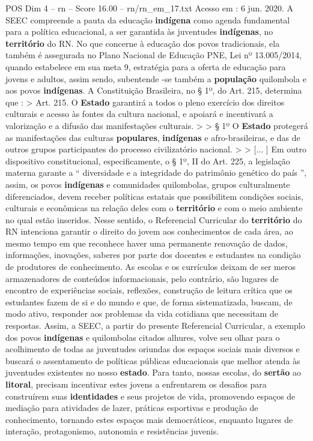 \begin{textsample}{POS Dim 4 – rn – Score 16.00 – rn/rn\_em\_17.txt}
Acesso em : 6 jun. 2020.
A SEEC compreende a pauta da educação \textbf{indígena} como agenda fundamental para a política educacional, a ser garantida às juventudes \textbf{indígenas}, no \textbf{território} do RN.
No que concerne à educação dos povos tradicionais, ela também é assegurada no Plano Nacional de Educação PNE, Lei nº 13.005/2014, quando estabelece em sua meta 9, estratégia para a oferta de educação para jovens e adultos, assim sendo, subentende -se também a \textbf{população} quilombola e aos povos \textbf{indígenas}.
A Constituição Brasileira, no § 1º, do Art. 215, determina que : > Art. 215.
O \textbf{Estado} garantirá a todos o pleno exercício dos direitos culturais e acesso às fontes da cultura nacional, e apoiará e incentivará a valorização e a difusão das manifestações culturais. > > § 1º O \textbf{Estado} protegerá as manifestações das culturas \textbf{populares}, \textbf{indígenas} e afro-brasileiras, e das de outros grupos participantes do processo civilizatório nacional. > > [... ] Em outro dispositivo constitucional, especificamente, o § 1º, II do Art. 225, a legislação materna garante a “ diversidade e a integridade do patrimônio genético do país ”, assim, os povos \textbf{indígenas} e comunidades quilombolas, grupos culturalmente diferenciados, devem receber políticas estatais que possibilitem condições sociais, culturais e econômicas na relação deles com o \textbf{território} e com o meio ambiente no qual estão inseridos.
Nesse sentido, o Referencial Curricular do \textbf{território} do RN intenciona garantir o direito do jovem aos conhecimentos de cada área, ao mesmo tempo em que reconhece haver uma permanente renovação de dados, informações, inovações, saberes por parte dos docentes e estudantes na condição de produtores de conhecimento.
As escolas e os currículos deixam de ser meros armazenadores de conteúdos informacionais, pelo contrário, são lugares de encontro de experiências sociais, reflexões, construção de leitura crítica que os estudantes fazem de si e do mundo e que, de forma sistematizada, buscam, de modo ativo, responder aos problemas da vida cotidiana que necessitam de respostas.
Assim, a SEEC, a partir do presente Referencial Curricular, a exemplo dos povos \textbf{indígenas} e quilombolas citados alhures, volve seu olhar para o acolhimento de todas as juventudes oriundas dos espaços sociais mais diversos e buscará o assentamento de políticas públicas educacionais que melhor atenda às juventudes existentes no nosso \textbf{estado}.
Para tanto, nossas escolas, do \textbf{sertão} ao \textbf{litoral}, precisam incentivar estes jovens a enfrentarem os desafios para construírem suas \textbf{identidades} e seus projetos de vida, promovendo espaços de mediação para atividades de lazer, práticas esportivas e produção de conhecimento, tornando estes espaços mais democráticos, enquanto lugares de interação, protagonismo, autonomia e resistências juvenis.

\end{textsample}
